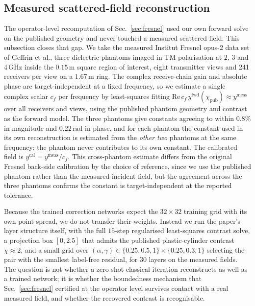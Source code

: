\documentclass[journal,cmes,article,submit,moreauthors,pdftex]{Definitions/tsp}
\begin{document}
\subsection{Measured scattered-field reconstruction}
\label{sec:fresnelrecon}

The operator-level recomputation of Sec.~\ref{sec:fresnel} used our own forward solve on
the published geometry and never touched a measured scattered field. This subsection
closes that gap. We take the measured Institut Fresnel opus-2 data set of Geffrin et
al.\@ \cite{fresnel_db}, three dielectric phantoms imaged in TM polarisation at
$2$, $3$ and $4\,\mathrm{GHz}$ inside the $0.15\,\mathrm{m}$ square region of interest,
eight transmitter views and 241 receivers per view on a $1.67\,\mathrm{m}$ ring. The
complex receive-chain gain and absolute phase are target-independent at a fixed
frequency, so we estimate a single complex scalar $c_f$ per frequency by least-squares
fitting $\mathrm{Re}\,c_f\,y^{\mathrm{fwd}}(\chi_{\mathrm{pub}})\approx y^{\mathrm{meas}}$
over all receivers and views, using the published phantom geometry and contrast as the
forward model. The three phantoms give constants agreeing to within $0.8\%$ in magnitude
and $0.22\,\mathrm{rad}$ in phase, and for each phantom the constant used in its own
reconstruction is estimated from the \emph{other two} phantoms at the same frequency; the
phantom never contributes to its own constant. The calibrated field is
$y^{\mathrm{cal}}=y^{\mathrm{meas}}/c_f$. This cross-phantom estimate differs from the
original Fresnel back-side calibration by the choice of reference, since we use the published phantom rather than the measured incident field, but the agreement across the
three phantoms confirms the constant is target-independent at the reported tolerance.

Because the trained correction networks expect the $32\times32$ training grid with its
own point spread, we do not transfer their weights. Instead we run the paper's layer
structure itself, with the full $15$-step regularised least-squares contrast solve, a
projection box $[0,2.5]$ that admits the published plastic-cylinder contrast $\chi\approx2$,
and a small grid over $(\alpha,\gamma)\in\{0.25,0.5,1\}\times\{0.25,0.3,1\}$ selecting
the pair with the smallest label-free residual, for $30$ layers on the measured fields.
The question is not whether a zero-shot classical iteration
reconstructs as well as a trained network; it is whether the boundedness mechanism that
Sec.~\ref{sec:fresnel} certified at the operator level survives contact with a real
measured field, and whether the recovered contrast is recognisable.
\end{document}
